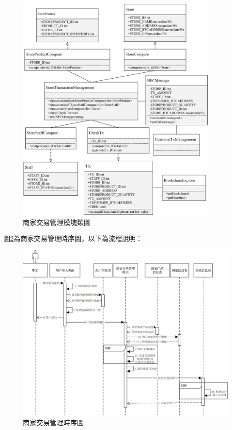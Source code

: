 	\begin{figure}[!htbp]
		\centering
		\includegraphics[width = 0.9\textwidth]{c5.jpg}
		\caption{商家交易管理模塊類圖}\label{c5}
	\end{figure}


圖\ref{time4}為商家交易管理時序圖，以下為流程說明：

	\begin{figure}[!htbp]
		\centering
		\includegraphics[width = 1\textwidth]{time4.jpg}
		\caption{商家交易管理時序圖}\label{time4}
	\end{figure}

